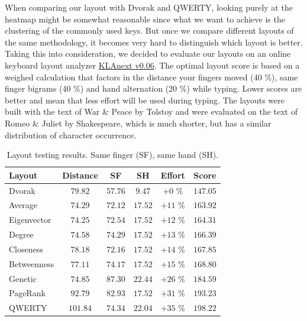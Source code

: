 \documentclass[9pt,twocolumn,twoside]{pnas-report}
\begin{document}
When comparing our layout with Dvorak and QWERTY, looking purely at the heatmap might be somewhat reasonable since what we want to achieve is the clustering of the commonly used keys.
But once we compare different layouts of the same methodology, it becomes very hard to distinguish which layout is better.
Taking this into consideration, we decided to evaluate our layouts on an online keyboard layout analyzer \href{https://klanext.keyboard-design.com/#/main}{KLAnext v0.06}.
The optimal layout score is based on a weighed calculation that factors in the distance your fingers moved (40 \%), same finger bigrams (40 \%) and hand alternation (20 \%) while typing.
Lower scores are better and mean that less effort will be used during typing.
The layouts were built with the text of War \& Peace by Tolstoy and were evaluated on the text of Romeo \& Juliet by Shakespeare, which is much shorter, but has a similar distribution of character occurrence. 

\begin{table}[t]\centering%
	\caption{Layout testing results. Same finger (SF), same hand (SH).}
	\begin{tabular}{lccccc}\toprule
        Layout      & Distance & SF      & SH      & Effort   & Score    \\\midrule
        Dvorak      & $79.82$  & $57.76$ & $9.47$  & $+0$ \%  & $147.05$ \\
        Average     & $74.29$  & $72.12$ & $17.52$ & $+11$ \% & $163.92$ \\
        Eigenvector & $74.25$  & $72.54$ & $17.52$ & $+12$ \% & $164.31$ \\
        Degree      & $74.58$  & $74.29$ & $17.52$ & $+13$ \% & $166.39$ \\
        Closeness   & $78.18$  & $72.16$ & $17.52$ & $+14$ \% & $167.85$ \\
        Betweenness & $77.11$  & $74.17$ & $17.52$ & $+15$ \% & $168.80$ \\
        Genetic     & $74.85$  & $87.30$ & $22.44$ & $+26$ \% & $184.59$ \\
        PageRank    & $92.79$  & $82.93$ & $17.52$ & $+31$ \% & $193.23$ \\
        QWERTY      & $101.84$ & $74.34$ & $22.04$ & $+35$ \% & $198.22$ \\\bottomrule
	\end{tabular}
	\label{tbl:scores}
\end{table}
\end{document}
